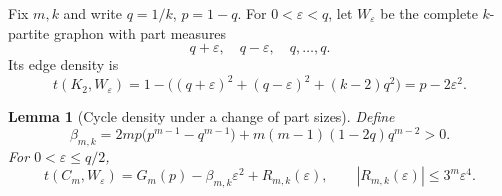 \documentclass[11pt]{article}
\newtheorem{lemma}{Lemma}[section]
\theoremstyle{remark}
\begin{document}
Fix $m,k$ and write $q=1/k$, $p=1-q$.
For $0<\varepsilon<q$, let $W_\varepsilon$ be the complete
$k$-partite graphon with part measures
\[
 q+\varepsilon,\quad q-\varepsilon,\quad q,\ldots,q.
\]
Its edge density is
\begin{equation}\label{eq:unbalanced-edge}
 t(K_2,W_\varepsilon)
 =1-\bigl((q+\varepsilon)^2+(q-\varepsilon)^2+(k-2)q^2\bigr)
 =p-2\varepsilon^2.
\end{equation}

\begin{lemma}[Cycle density under a change of part sizes]
\label{lem:expansion}
Define
\begin{equation}\label{eq:beta}
 \beta_{m,k}
 =2mp\bigl(p^{m-1}-q^{m-1}\bigr)
  +m(m-1)(1-2q)q^{m-2}>0.
\end{equation}
For $0<\varepsilon\leq q/2$,
\begin{equation}\label{eq:unbalanced-cycle}
 t(C_m,W_\varepsilon)
 =G_m(p)-\beta_{m,k}\varepsilon^2+R_{m,k}(\varepsilon),
 \qquad |R_{m,k}(\varepsilon)|\leq3^m\varepsilon^4.
\end{equation}
\end{lemma}
\end{document}
